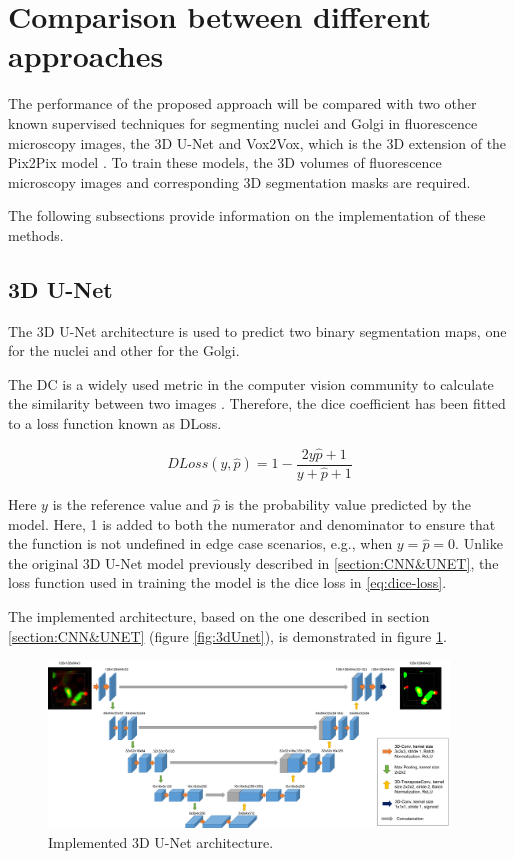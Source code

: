 \section{Comparison between different approaches}
\label{section:comparison}

The performance of the proposed approach will be compared with two other known supervised techniques for segmenting nuclei and Golgi in fluorescence microscopy images, the 3D U-Net \cite{Unet:3D} and Vox2Vox, which is the 3D extension of the Pix2Pix model \cite{isola2018imagetoimage}. To train these models, the 3D volumes of fluorescence microscopy images and corresponding 3D segmentation masks are required.

The following subsections provide information on the implementation of these methods.

\subsection{3D U-Net}

The 3D U-Net architecture is used to predict two binary segmentation maps, one for the nuclei and other for the Golgi.

The \ac{DC} is a widely used metric in the computer vision community to calculate the similarity between two images \cite{diceloss}. Therefore, the dice coefficient has been fitted to a loss function known as \ac{DLoss}.

\begin{equation}
    DLoss(y,\hat{p}) = 1 - \frac{2y\hat{p}+1}{y+\hat{p}+1}
    \label{eq:dice-loss}
\end{equation}

Here $y$ is the reference value and $\hat{p}$ is the probability value predicted by the model. Here, 1 is added to both the numerator and denominator to ensure that the function is not undefined in edge case scenarios, e.g., when $y=\hat{p}=0$. Unlike the original 3D U-Net model \cite{Unet:3D} previously described in \ref{section:CNN&UNET}, the loss function used in training the model is the dice loss in \ref{eq:dice-loss}.

The implemented architecture, based on the one described in section \ref{section:CNN&UNET} (figure \ref{fig:3dUnet}), is demonstrated in figure \ref{fig:y-unet-3d}.

\begin{figure}[!htb]
  \centering
  \includegraphics[width=0.95\textwidth]{Images/Picture1.jpg}
  \caption[Implemented 3D U-Net architecture.]{Implemented 3D U-Net architecture.}
  \label{fig:y-unet-3d}
\end{figure}

